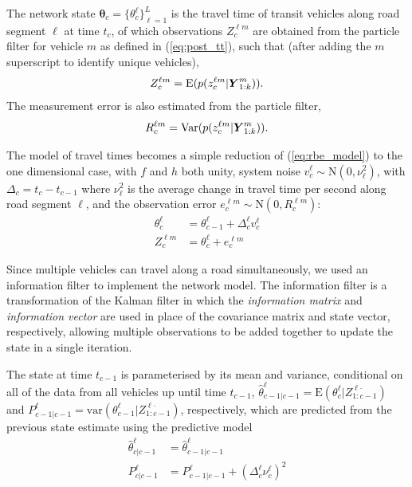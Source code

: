 The network state $\boldsymbol\theta_c = \{\theta_c^\ell\}_{\ell = 1}^L$ is the travel time 
of transit vehicles along road segment $\ell$ at time $t_c$,
of which observations $Z_c^{\ell m}$
are obtained from the particle filter for vehicle $m$ as defined in
(\ref{eq:post_tt}), such that 
(after adding the $m$ superscript to identify unique vehicles), 
\begin{equation*}
Z_c^{\ell m} = \mathrm{E}(p(z_c^{\ell m} | \mbox{$\boldsymbol{Y}$}^m_{1:k})).
\end{equation*}
The measurement error is also estimated from the particle filter,
\begin{equation*}
R_c^{\ell m} = \mathrm{Var}(p(z_c^{\ell m} | \mbox{$\boldsymbol{Y}$}^m_{1:k})).
\end{equation*}

The model of travel times becomes a simple reduction of (\ref{eq:rbe_model}) 
to the one dimensional case, 
with $f$ and $h$ both unity,
system noise $v_c^\ell \sim \mathrm{N}(0, \nu_\ell^2)$,
with $\Delta_c = t_c - t_{c-1}$
where $\nu_\ell^2$ is the average change in travel time per second
along road segment $\ell$,
and the observation error $e_c^{\ell m} \sim \mathrm{N}(0, R_c^{\ell m})$:
\begin{equation*}
\begin{split}
\theta_c^\ell &= \theta_{c-1}^\ell + \Delta_c^\ell v_c^\ell \\
Z_c^{\ell m} &= \theta_c^\ell + e_c^{\ell m}
\end{split}
\end{equation*}


Since multiple vehicles can travel along a road simultaneously,
we used an information filter to implement the network model.
The information filter is a transformation of the Kalman filter in which the
\emph{information matrix} and \emph{information vector} are used in place of 
the covariance matrix and state vector, respectively,
allowing multiple observations to be added together to update the state
in a single iteration.


The state at time $t_{c-1}$ is parameterised by its mean and variance,
conditional on all of the data from all vehicles up until time $t_{c-1}$,
$\hat \theta_{c-1|c-1}^\ell = \mathrm{E}(\theta_c^\ell | Z_{1:c-1}^{\ell\boldsymbol{\cdot}})$
and \mbox{$P_{c-1|c-1}^\ell = \mathrm{var}(\theta_{c-1}^\ell | Z_{1:c-1}^{\ell\boldsymbol{\cdot}})$}, respectively,
which are predicted from the previous state estimate using the predictive model
\begin{align*}
\label{eq:kf_transition}
\hat \theta^\ell_{c|c-1} &= \hat \theta^\ell_{c-1|c-1} \\
P^\ell_{c|c-1} &= P^\ell_{c-1|c-1} + (\Delta_c^\ell \nu_c^\ell)^2
\end{align*}

